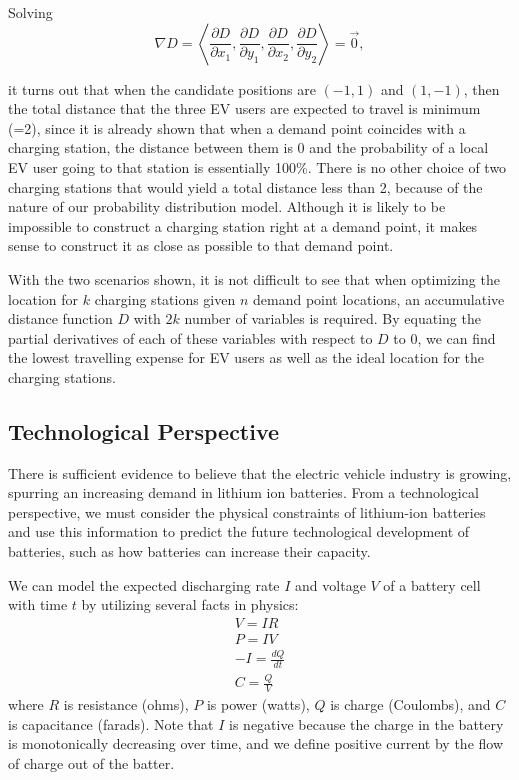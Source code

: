 \documentclass[10pt]{article}
\begin{document}
Solving
\begin{equation}
\nabla D = \left<
 \frac{\partial D}{\partial x_1},
 \frac{\partial D}{\partial y_1},
 \frac{\partial D}{\partial x_2},
 \frac{\partial D}{\partial y_2}
\right> = \vec{0},
\end{equation}

it turns out that when the candidate positions are $(-1,1)$ and $(1,-1)$, then the total distance that the three EV users are expected to travel is minimum (=2), since it is already shown that when a demand point coincides with a charging station, the distance between them is 0 and the probability of a local EV user going to that station is essentially 100\%. There is no other choice of two charging stations that would yield a total distance less than 2, because of the nature of our probability distribution model. Although it is likely to be impossible to construct a charging station right at a demand point, it makes sense to construct it as close as possible to that demand point.

With the two scenarios shown, it is not difficult to see that when optimizing the location for $k$ charging stations given $n$ demand point locations, an accumulative distance function $D$ with $2k$ number of variables is required. By equating the partial derivatives of each of these variables with respect to $D$ to 0, we can find the lowest travelling expense for EV users as well as the ideal location for the charging stations.

\subsection{Technological Perspective}

There is sufficient evidence to believe that the electric vehicle industry is growing, spurring an increasing demand in lithium ion batteries. From a technological perspective, we must consider the physical constraints of lithium-ion batteries and use this information to predict the future technological development of batteries, such as how batteries can increase their capacity.

We can model the expected discharging rate $I$ and voltage $V$ of a battery cell with time $t$ by utilizing several facts in physics:
\begin{align}
    V = IR \label{eq:v} \\ 
    P = IV \label{eq:p} \\
    -I = \frac{dQ}{dt}\label{eq:current}\\ 
    C = \frac{Q}{V} \label{eq:c}
\end{align}
where $R$ is resistance (ohms), $P$ is power (watts), $Q$ is charge (Coulombs), and $C$ is capacitance (farads). Note that $I$ is negative because the charge in the battery is monotonically decreasing over time, and we define positive current by the flow of charge out of the batter.
\end{document}
